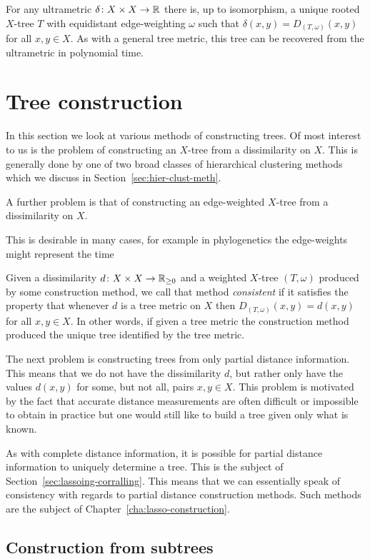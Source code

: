 For any ultrametric $\delta \colon X \times X \to {\mathbb R}$ there is, up to
isomorphism, a unique rooted $X$-tree $T$ with equidistant edge-weighting
$\omega$ such that $\delta(x,y) = D_{(T,\omega)}(x,y)$ for all $x,y \in X$.
As with a general tree metric, this tree can be recovered from the ultrametric
in polynomial time.

\section{Tree construction}
\label{sec:tree-construction}

In this section we look at various methods of constructing trees.  Of most
interest to us is the problem of constructing an $X$-tree from a dissimilarity
on $X$.  This is generally done by one of two broad classes of hierarchical
clustering methods which we discuss in Section~\ref{sec:hier-clust-meth}.

A further problem is that of constructing an edge-weighted $X$-tree from a
dissimilarity on $X$.

This is desirable in many cases, for example in
phylogenetics the edge-weights might represent the time 

Given a dissimilarity $d \colon X \times X \to {\mathbb R}_{\geq 0}$ and a weighted
$X$-tree $(T,\omega)$ produced by some construction method, we call that
method \textit{consistent} if it satisfies the property that whenever $d$ is a
tree metric on $X$ then $D_{(T,\omega)}(x,y) = d(x,y)$ for all $x,y \in X$.
In other words, if given a tree metric the construction method produced the
unique tree identified by the tree metric.

The next problem is constructing trees from only partial distance information.
This means that we do not have the dissimilarity $d$, but rather only have the
values $d(x,y)$ for some, but not all, pairs $x,y \in X$.  This problem is
motivated by the fact that accurate distance measurements are often difficult
or impossible to obtain in practice but one would still like to build a tree
given only what is known.

As with complete distance information, it is possible for partial distance
information to uniquely determine a tree.  This is the subject of
Section~\ref{sec:lassoing-corralling}.  This means that we can essentially
speak of consistency with regards to partial distance construction methods.
Such methods are the subject of Chapter~\ref{cha:lasso-construction}.

\subsection{Construction from subtrees}
\label{sec:constr-from-subtr}

